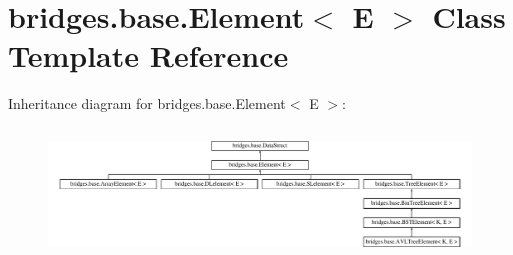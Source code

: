\hypertarget{classbridges_1_1base_1_1_element}{}\section{bridges.\+base.\+Element$<$ E $>$ Class Template Reference}
\label{classbridges_1_1base_1_1_element}
Inheritance diagram for bridges.\+base.\+Element$<$ E $>$\+:\begin{figure}[H]
\begin{center}
\leavevmode
\includegraphics[height=3.485477cm]{classbridges_1_1base_1_1_element}
\end{center}
\end{figure}
